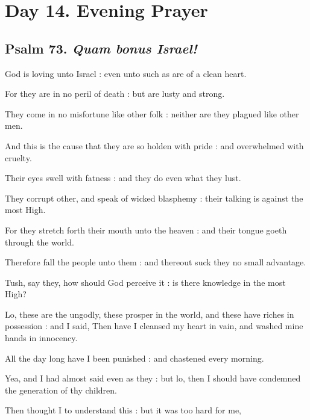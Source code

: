 \section*{Day 14. Evening Prayer}

\subsection{Psalm 73. \textit{Quam bonus Israel!}}

 God is loving unto Israel : even unto such as are of a clean heart.\par
{}
For they are in no peril of death : but are lusty and strong.\par
{}They come in no misfortune like other folk : neither are they plagued like other men.\par
{}And this is the cause that they are so holden with pride : and overwhelmed with cruelty.\par
{}Their eyes swell with fatness : and they do even what they lust.\par
{}They corrupt other, and speak of wicked blasphemy : their talking is against the most High.\par
{}For they stretch forth their mouth unto the heaven : and their tongue goeth through the world.\par
{}Therefore fall the people unto them : and thereout suck they no small advantage.\par
{}Tush, say they, how should God perceive it : is there knowledge in the most High?\par
{}Lo, these are the ungodly, these prosper in the world, and these have riches in possession : and I said, Then have I cleansed my heart in vain, and washed mine hands in innocency.\par
{}All the day long have I been punished : and chastened every morning.\par
{}Yea, and I had almost said even as they : but lo, then I should have condemned the generation of thy children.\par
{}Then thought I to understand this : but it was too hard for me,\par
